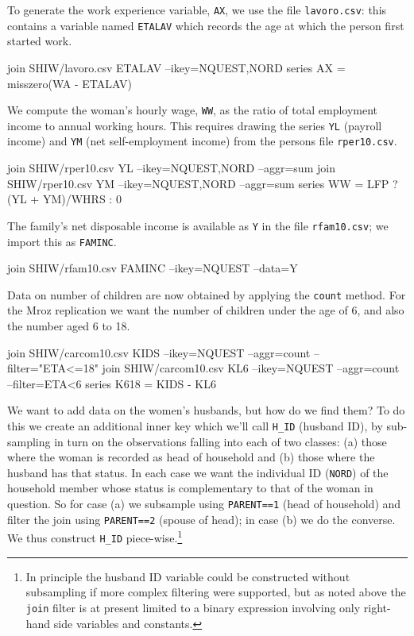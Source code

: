 To generate the work experience variable, \texttt{AX}, we use the file
\texttt{lavoro.csv}: this contains a variable named \texttt{ETALAV}
which records the age at which the person first started work.
%
\begin{code}
join SHIW/lavoro.csv ETALAV --ikey=NQUEST,NORD
series AX = misszero(WA - ETALAV)
\end{code}
%
We compute the woman's hourly wage, \texttt{WW}, as the ratio of total
employment income to annual working hours.  This requires drawing the
series \texttt{YL} (payroll income) and \texttt{YM} (net
self-employment income) from the persons file \texttt{rper10.csv}.
%
\begin{code}
join SHIW/rper10.csv YL --ikey=NQUEST,NORD --aggr=sum
join SHIW/rper10.csv YM --ikey=NQUEST,NORD --aggr=sum
series WW = LFP ? (YL + YM)/WHRS : 0
\end{code}
%
The family's net disposable income is available as \texttt{Y} in the file
\texttt{rfam10.csv}; we import this as \texttt{FAMINC}.
%
\begin{code}
join SHIW/rfam10.csv FAMINC --ikey=NQUEST --data=Y
\end{code}
%
Data on number of children are now obtained by applying the
\texttt{count} method. For the Mroz replication we want the number of
children under the age of 6, and also the number aged 6 to 18.
%
\begin{code}
join SHIW/carcom10.csv KIDS --ikey=NQUEST --aggr=count --filter="ETA<=18"
join SHIW/carcom10.csv KL6 --ikey=NQUEST --aggr=count --filter=ETA<6
series K618 = KIDS - KL6
\end{code}
%
We want to add data on the women's husbands, but how do we find them?
To do this we create an additional inner key which we'll call
\verb|H_ID| (husband ID), by sub-sampling in turn on the observations
falling into each of two classes: (a) those where the woman is
recorded as head of household and (b) those where the husband has that
status. In each case we want the individual ID (\texttt{NORD}) of the
household member whose status is complementary to that of the woman in
question. So for case (a) we subsample using \texttt{PARENT==1} (head
of household) and filter the join using \texttt{PARENT==2} (spouse of
head); in case (b) we do the converse. We thus construct \verb|H_ID|
piece-wise.\footnote{In principle the husband ID variable could be
  constructed without subsampling if more complex filtering were
  supported, but as noted above the \texttt{join} filter is at present
  limited to a binary expression involving only right-hand side
  variables and constants.}
